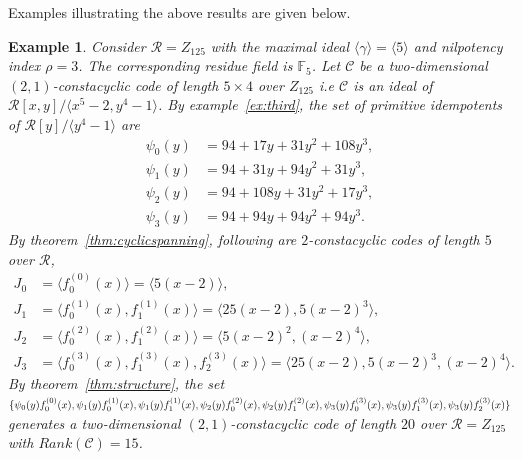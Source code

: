 \documentclass[12pt,a4paper]{article}
\newtheorem{example}{Example}
\begin{document}
Examples illustrating the above results are given below.
\begin{example}\label{ex:fifth}
    Consider $\mathcal{R}=Z_{125}$ with the maximal ideal $\langle\gamma\rangle=\langle5\rangle$ and nilpotency index $\rho=3$. The corresponding residue field is $\mathbb{F}_5$. Let $\mathscr{C}$ be a two-dimensional $(2,1)$-constacyclic code of length $5 \times 4$ over $Z_{125}$ i.e $\mathscr{C}$ is an ideal of $\mathcal{R}[x,y]/\langle x^5-2, y^4-1 \rangle$. By example~\ref{ex:third}, the set of primitive idempotents of $\mathcal{R}[y]/\langle y^4-1 \rangle$ are
    \[
    \begin{aligned}
    \psi_0(y)&= 94+17y+31y^2+108y^3,\\
    \psi_1(y)&= 94+31y+94y^2+31y^3,\\
    \psi_2(y)&= 94+108y+31y^2+17y^3,\\
    \psi_3(y)&= 94+94y+94y^2+94y^3.
    \end{aligned}
    \]
    By theorem~\ref{thm:cyclicspanning}, following are $2$-constacyclic codes of length $5$ over $\mathcal{R}$,
    \[
    \begin{aligned}
    J_0 &= \langle f^{(0)}_0(x) \rangle = \langle 5(x-2) \rangle, \\
    J_1 &= \langle f^{(1)}_0(x), f^{(1)}_1(x) \rangle = \langle 25(x-2), 5(x-2)^3 \rangle, \\
    J_2 &= \langle f^{(2)}_0(x), f^{(2)}_1(x) \rangle = \langle 5(x-2)^2, (x-2)^4 \rangle, \\
    J_3 &= \langle f^{(3)}_0(x), f^{(3)}_1(x), f^{(3)}_2(x) \rangle 
    = \langle 25(x-2), 5(x-2)^3, (x-2)^4 \rangle.
    \end{aligned}
    \]
    By theorem~\ref{thm:structure}, the set $\{ \psi_0(y)f^{(0)}_0(x),\psi_1(y)f^{(1)}_0(x),\psi_1(y)f^{(1)}_1(x),\psi_2(y)f^{(2)}_0(x),\psi_2(y)f^{(2)}_1(x),\\ \psi_3(y)f^{(3)}_0(x),\psi_3(y)f^{(3)}_1(x),\psi_3(y)f^{(3)}_2(x)\}$ generates a two-dimensional $(2,1)$-constacyclic code of length $20$ over $\mathcal{R}=Z_{125}$ with $Rank(\mathcal{C})=15$.
\end{example}
\end{document}
